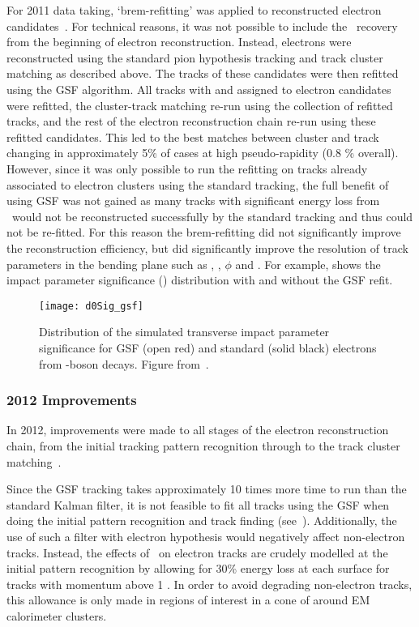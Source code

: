 For 2011 data taking, `brem-refitting' was applied to
reconstructed electron candidates~\cite{ATLAS-CONF-2012-047}. For technical reasons, it was not possible to
include the \brem\ recovery from the beginning of electron reconstruction.
Instead, electrons were reconstructed using the standard pion hypothesis
tracking and track cluster matching as described above. The tracks of these candidates were then refitted
using the GSF algorithm. All tracks with  and  assigned to
electron candidates were refitted, the cluster-track matching re-run
using the collection of refitted tracks, and the rest of the electron reconstruction
chain re-run using these refitted candidates. This led to the best matches between
cluster and track changing in approximately 5\% of cases at high pseudo-rapidity (0.8 \%
overall). However, since it was only possible to run the refitting on tracks
already associated to electron clusters using the standard tracking, the full
benefit of using GSF was not gained as many tracks with significant energy loss
from \brem\ would not be reconstructed successfully by the standard tracking and
thus could not be re-fitted. For this reason the brem-refitting did not
significantly improve the reconstruction efficiency, but did significantly
improve the resolution of track parameters in the bending plane such as \dzero, \dzerosig,
$\phi$ and \qoverp. For example,  shows the impact parameter
significance (\dzerosig) distribution with and without the GSF refit. 

\begin{figure}[h!]
\centering
            \texttt{[image: d0Sig\_gsf]}
\caption{
Distribution of the simulated transverse impact parameter significance for GSF (open
red) and standard (solid black) electrons from \Z-boson decays. 
Figure from~\cite{ATLAS-CONF-2012-047}.}
\label{fig:d0Sig-gsf}
\end{figure}

\subsubsection{2012 Improvements}

In 2012, improvements were made to all stages of the electron reconstruction
chain, from the initial tracking pattern recognition through to the track
cluster matching~\cite{HSG2:1456228}. 

Since the GSF tracking takes approximately 10 times more time to
run than the standard Kalman filter, it is not feasible to fit all tracks using
the GSF when doing the initial pattern recognition and track finding (see~). 
Additionally, the use of such a filter with electron hypothesis would
negatively affect non-electron tracks. Instead, the effects of \brem\ on
electron tracks are crudely modelled at the initial pattern recognition by allowing for 30\% energy loss at each surface for tracks with
momentum above 1 \gev. In order to avoid degrading non-electron tracks, this allowance is only made in regions of interest in a
cone of  around EM calorimeter clusters. 

